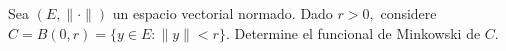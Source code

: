 Sea $(E,\|\cdot\|)$ un espacio vectorial normado. Dado $r>0,$ considere $C=B(0,r)=\{y\in E:\|y\|<r\}.$ Determine el funcional de Minkowski de $C.$

